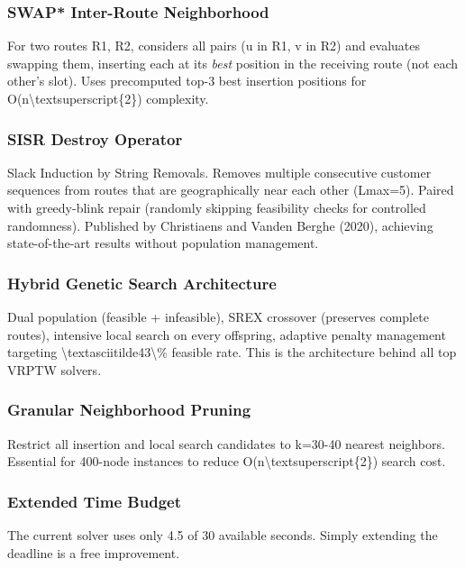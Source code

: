 \documentclass[twocolumn,10pt,letterpaper]{article}
\begin{document}
\subsubsection{SWAP* Inter-Route Neighborhood}

For two routes R1, R2, considers all pairs (u in R1, v in R2) and evaluates swapping them, inserting each at its \textit{best} position in the receiving route (not each other's slot). Uses precomputed top-3 best insertion positions for O(n\textbackslash{}textsuperscript\{2\}) complexity.


\subsubsection{SISR Destroy Operator}

Slack Induction by String Removals. Removes multiple consecutive customer sequences from routes that are geographically near each other (Lmax=5). Paired with greedy-blink repair (randomly skipping feasibility checks for controlled randomness). Published by Christiaens and Vanden Berghe (2020), achieving state-of-the-art results without population management.


\subsubsection{Hybrid Genetic Search Architecture}

Dual population (feasible + infeasible), SREX crossover (preserves complete routes), intensive local search on every offspring, adaptive penalty management targeting \textbackslash{}textasciitilde43\textbackslash{}\% feasible rate. This is the architecture behind all top VRPTW solvers.


\subsubsection{Granular Neighborhood Pruning}

Restrict all insertion and local search candidates to k=30-40 nearest neighbors. Essential for 400-node instances to reduce O(n\textbackslash{}textsuperscript\{2\}) search cost.


\subsubsection{Extended Time Budget}

The current solver uses only 4.5 of 30 available seconds. Simply extending the deadline is a free improvement.
\end{document}
